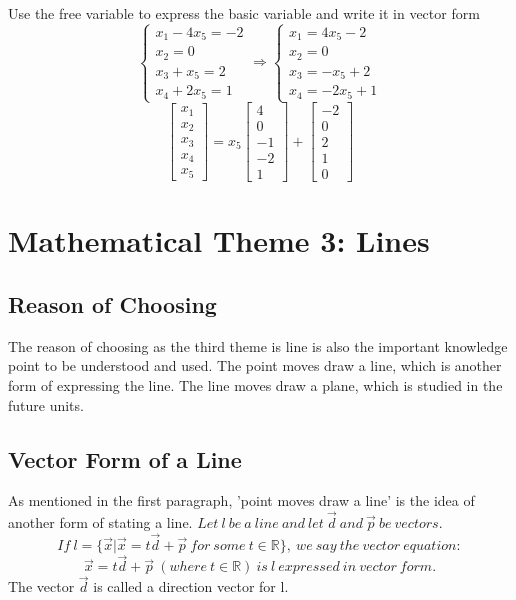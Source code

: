 \documentclass{article}
\begin{document}
Use the free variable to express the basic variable and write it in vector form
$$\left \{ \begin{array}{rcl}
	x_1 -4 x_5 = -2 \\
	x_2 = 0 \\ 
	x_3 + x_5 = 2\\
	x_4 + 2 x_5 = 1 \end{array}\right. 
\Longrightarrow
\left \{ \begin{array}{rcl}
	x_1 = 4x_5 - 2 \\
	x_2 = 0\\ 
	x_3 = -x_5 +2\\
	x_4 = -2x_5 +1 \end{array}\right. 
$$
$$\left[\begin{array}{c}
	x_1 \\
	x_2 \\
	x_3 \\
	x_4 \\
	x_5
	\end{array} \right ] =
	x_5 \left[\begin{array}{c}
	4 \\
	0 \\
	-1 \\
	-2 \\
	1
	\end{array} \right ] + 
	\left[\begin{array}{c}
	-2 \\
	0 \\
	2 \\
	1 \\
	0
	\end{array} \right ]$$

\newpage
\section{Mathematical Theme 3: Lines}
\subsection{Reason of Choosing}
\quad The reason of choosing as the third theme is line is also the important knowledge point to be understood and used. The point moves draw a line, which is another form of expressing the line. The line moves draw a plane, which is studied in the future units. 

\subsection{Vector Form of a Line}
\quad As mentioned in the first paragraph, 'point moves draw a line' is the idea of another form of stating a line. $Let\ l\ be\ a\ line\ and\ let\ \overrightarrow{d}\ and\ \overrightarrow{p}\ be\ vectors.$
$$If\ l = \{\overrightarrow{x}|\overrightarrow{x} = t \overrightarrow{d}+\overrightarrow{p}\ for\ some\ t \in \mathbb{R}\},\ we\ say\ the\ vector\ equation:$$
$$\overrightarrow{x} = t\overrightarrow{d} + \overrightarrow{p}\ (where\ t \in \mathbb{R})\ is\ l\ expressed\ in\ vector\ form.$$
The vector $\overrightarrow{d}$ is called a direction vector for l.
\end{document}

